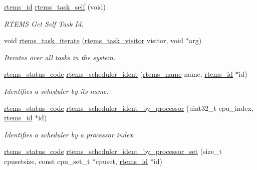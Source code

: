 \begin{DoxyCompactItemize}
\mbox{\hyperlink{group__ClassicTasks_gab20892b814dced7dd4e5b9bf42becd57}{rtems\+\_\+id}} \mbox{\hyperlink{group__ClassicTasks_gae2e554d80b478d7e7040c34a40afb6db}{rtems\+\_\+task\+\_\+self}} (void)
\begin{DoxyCompactList}\small\item\em R\+T\+E\+MS Get Self Task Id. \end{DoxyCompactList}\item 
void \mbox{\hyperlink{group__ClassicTasks_ga7255f41eb20238aebe5ce139d5dfd97d}{rtems\+\_\+task\+\_\+iterate}} (\mbox{\hyperlink{group__ClassicTasks_ga861b5d2aa73bff68304c15cbb2b9c688}{rtems\+\_\+task\+\_\+visitor}} visitor, void $\ast$arg)
\begin{DoxyCompactList}\small\item\em Iterates over all tasks in the system. \end{DoxyCompactList}\item 
\mbox{\hyperlink{group__ClassicStatus_ga545d41846817eaba6143d52ee4d9e9fe}{rtems\+\_\+status\+\_\+code}} \mbox{\hyperlink{group__ClassicTasks_ga8161245a1768f06057d17eefdba253ca}{rtems\+\_\+scheduler\+\_\+ident}} (\mbox{\hyperlink{group__ClassicTasks_ga55fb63c49f68c0cbd9bee004da15b1fd}{rtems\+\_\+name}} name, \mbox{\hyperlink{group__ClassicTasks_gab20892b814dced7dd4e5b9bf42becd57}{rtems\+\_\+id}} $\ast$id)
\begin{DoxyCompactList}\small\item\em Identifies a scheduler by its name. \end{DoxyCompactList}\item 
\mbox{\hyperlink{group__ClassicStatus_ga545d41846817eaba6143d52ee4d9e9fe}{rtems\+\_\+status\+\_\+code}} \mbox{\hyperlink{group__ClassicTasks_gad09bcc5a41e197368ad19c1d795059ca}{rtems\+\_\+scheduler\+\_\+ident\+\_\+by\+\_\+processor}} (uint32\+\_\+t cpu\+\_\+index, \mbox{\hyperlink{group__ClassicTasks_gab20892b814dced7dd4e5b9bf42becd57}{rtems\+\_\+id}} $\ast$id)
\begin{DoxyCompactList}\small\item\em Identifies a scheduler by a processor index. \end{DoxyCompactList}\item 
\mbox{\hyperlink{group__ClassicStatus_ga545d41846817eaba6143d52ee4d9e9fe}{rtems\+\_\+status\+\_\+code}} \mbox{\hyperlink{group__ClassicTasks_ga77fc4026688530e7c81270dcab036a8b}{rtems\+\_\+scheduler\+\_\+ident\+\_\+by\+\_\+processor\+\_\+set}} (size\+\_\+t cpusetsize, const cpu\+\_\+set\+\_\+t $\ast$cpuset, \mbox{\hyperlink{group__ClassicTasks_gab20892b814dced7dd4e5b9bf42becd57}{rtems\+\_\+id}} $\ast$id)

\end{DoxyCompactItemize}
